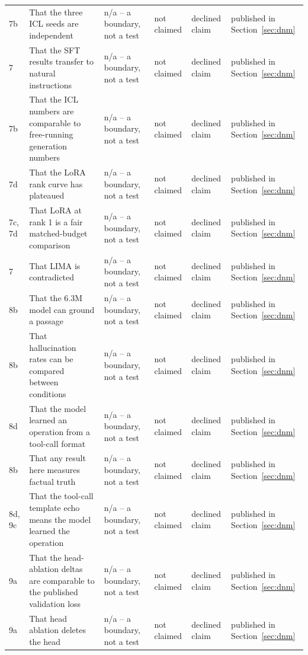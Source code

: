 {\begin{longtable}{L{0.9cm}L{2.8cm}L{2.7cm}L{3.0cm}L{1.9cm}L{2.1cm}}
7b & That the three ICL seeds are independent & n/a -- a boundary, not a test & not claimed & declined claim & published in Section~\ref{sec:dnm} \\
7 & That the SFT results transfer to natural instructions & n/a -- a boundary, not a test & not claimed & declined claim & published in Section~\ref{sec:dnm} \\
7b & That the ICL numbers are comparable to free-running generation numbers & n/a -- a boundary, not a test & not claimed & declined claim & published in Section~\ref{sec:dnm} \\
7d & That the LoRA rank curve has plateaued & n/a -- a boundary, not a test & not claimed & declined claim & published in Section~\ref{sec:dnm} \\
7c, 7d & That LoRA at rank 1 is a fair matched-budget comparison & n/a -- a boundary, not a test & not claimed & declined claim & published in Section~\ref{sec:dnm} \\
7 & That LIMA is contradicted & n/a -- a boundary, not a test & not claimed & declined claim & published in Section~\ref{sec:dnm} \\
8b & That the 6.3M model can ground a passage & n/a -- a boundary, not a test & not claimed & declined claim & published in Section~\ref{sec:dnm} \\
8b & That hallucination rates can be compared between conditions & n/a -- a boundary, not a test & not claimed & declined claim & published in Section~\ref{sec:dnm} \\
8d & That the model learned an operation from a tool-call format & n/a -- a boundary, not a test & not claimed & declined claim & published in Section~\ref{sec:dnm} \\
8b & That any result here measures factual truth & n/a -- a boundary, not a test & not claimed & declined claim & published in Section~\ref{sec:dnm} \\
8d, 9c & That the tool-call template echo means the model learned the operation & n/a -- a boundary, not a test & not claimed & declined claim & published in Section~\ref{sec:dnm} \\
9a & That the head-ablation deltas are comparable to the published validation loss & n/a -- a boundary, not a test & not claimed & declined claim & published in Section~\ref{sec:dnm} \\
9a & That head ablation deletes the head & n/a -- a boundary, not a test & not claimed & declined claim & published in Section~\ref{sec:dnm} \\

\end{longtable}}
